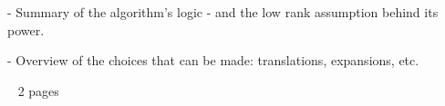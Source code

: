 - Summary of the algorithm's logic - and the low rank assumption behind its power. 

- Overview of the choices that can be made: translations, expansions, etc.

~ 2 pages